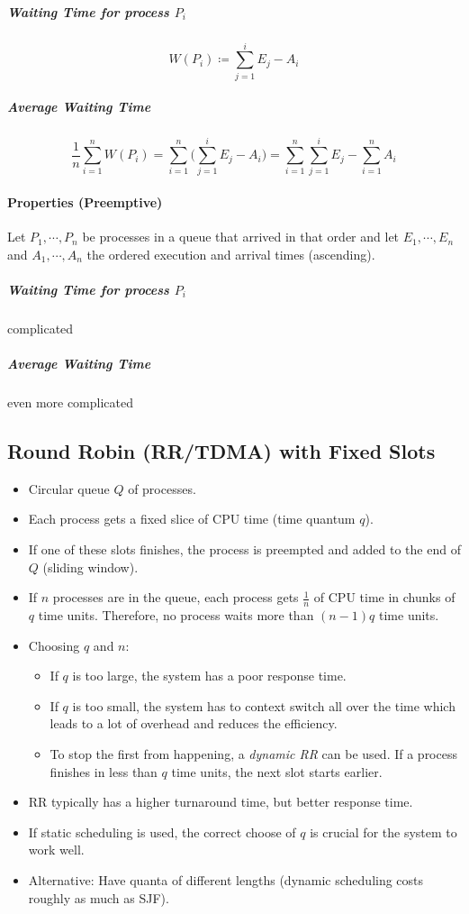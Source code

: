 \subparagraph{Waiting Time for process \(P_i\)}
\begin{equation*}
	W(P_i) \coloneqq \sum_{j = 1}^{i} E_j - A_i
\end{equation*}

\subparagraph{Average Waiting Time}
	\begin{equation*}
		\frac{1}{n} \sum_{i = 1}^{n} W(P_i) = \sum_{i = 1}^{n} \Bigg(\sum_{j = 1}^{i} E_j - A_i\Bigg) = \sum_{i = 1}^{n} \sum_{j = 1}^{i} E_j - \sum_{i = 1}^{n} A_i
	\end{equation*}

\paragraph{Properties (Preemptive)}
Let \( P_1, \cdots, P_n \) be processes in a queue that arrived in that order and let \( E_1, \cdots, E_n \) and \( A_1, \cdots, A_n \) the ordered execution and arrival times (ascending).

\subparagraph{Waiting Time for process \(P_i\)}
	complicated 

	\subparagraph{Average Waiting Time}
		even more complicated 

\subsection{Round Robin (RR/TDMA) with Fixed Slots}
	\begin{itemize}
		\item Circular queue \(Q\) of processes.
		\item Each process gets a fixed slice of CPU time (time quantum \(q\)).
		\item If one of these slots finishes, the process is preempted and added to the end of \(Q\) (sliding window).
		\item If \(n\) processes are in the queue, each process gets \( \frac{1}{n} \) of CPU time in chunks of \(q\) time units. Therefore, no process waits more than \( (n - 1)q \) time units.
		\item Choosing \(q\) and \(n\):
			\begin{itemize}
				\item If \(q\) is too large, the system has a poor response time.
				\item If \(q\) is too small, the system has to context switch all over the time which leads to a lot of overhead and reduces the efficiency.
				\item To stop the first from happening, a \textit{dynamic RR} can be used. If a process finishes in less than \(q\) time units, the next slot starts earlier.
			\end{itemize}
		\item RR typically has a higher turnaround time, but better response time.
		\item If static scheduling is used, the correct choose of \(q\) is crucial for the system to work well.
		\item Alternative: Have quanta of different lengths (dynamic scheduling costs roughly as much as SJF).
	\end{itemize}

